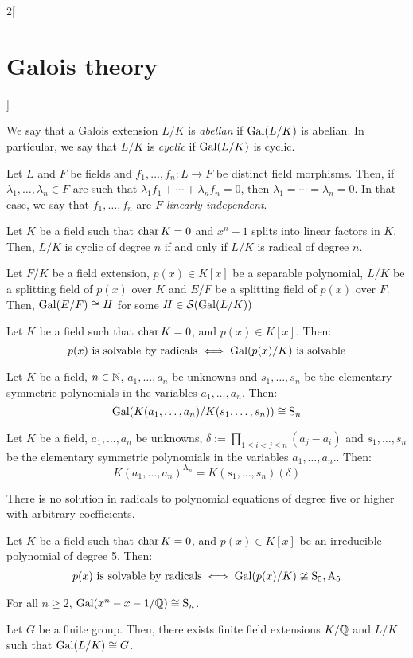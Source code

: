 \documentclass[../../../main.tex]{subfiles}
\begin{document}
\begin{multicols}{2}[\section{Galois theory}]
  \begin{definition}
    We say that a Galois extension $L/K$ is \emph{abelian} if $\operatorname{Gal}(L/K)$ is abelian. In particular, we say that $L/K$ is \emph{cyclic} if $\operatorname{Gal}(L/K)$ is cyclic.
  \end{definition}
  \begin{lemma}
    Let $L$ and $F$ be fields and $f_1,\ldots,f_n:L\rightarrow F$ be distinct field morphisms. Then, if $\lambda_1,\ldots,\lambda_n\in F$ are such that $\lambda_1f_1+\cdots+\lambda_nf_n=0$, then $\lambda_1=\cdots=\lambda_n=0$. In that case, we say that $f_1,\ldots,f_n$ are \emph{$F$-linearly independent}.
  \end{lemma}
  \begin{theorem}
    Let $K$ be a field such that $\operatorname{char} K=0$ and $x^n-1$ splits into linear factors in $K$. Then, $L/K$ is cyclic of degree $n$ if and only if $L/K$ is radical of degree $n$.
  \end{theorem}
  \begin{lemma}
    Let $F/K$ be a field extension, $p(x)\in K[x]$ be a separable polynomial, $L/K$ be a splitting field of $p(x)$ over $K$ and $E/F$ be a splitting field of $p(x)$ over $F$. Then, $\operatorname{Gal}(E/F)\cong H$ for some $H\in\mathcal{S}(\operatorname{Gal}(L/K))$
  \end{lemma}
  \begin{theorem}
    Let $K$ be a field such that $\operatorname{char} K=0$, and $p(x)\in K[x]$. Then: $$p(x)\text{ is solvable by radicals}\iff\operatorname{Gal}(p(x)/K)\text{ is solvable}$$
  \end{theorem}
  \begin{lemma}
    Let $K$ be a field, $n\in\mathbb{N}$, $a_1,\ldots,a_n$ be unknowns and $s_1,\ldots,s_n$ be the elementary symmetric polynomials in the variables $a_1,\ldots,a_n$. Then: $$\operatorname{Gal}(K(a_1,\ldots,a_n)/K(s_1,\ldots,s_n))\cong \text{S}_n$$
  \end{lemma}
  \begin{corollary}
    Let $K$ be a field, $a_1,\ldots,a_n$ be unknowns, $\delta:=\prod_{1\leq i<j\leq n}(a_j-a_i)$ and $s_1,\ldots,s_n$ be the elementary symmetric polynomials in the variables $a_1,\ldots,a_n$.. Then: $${K(a_1,\ldots,a_n)}^{\text{A}_n}=K(s_1,\ldots,s_n)(\delta)$$
  \end{corollary}
  \begin{theorem}
    There is no solution in radicals to polynomial equations of degree five or higher with arbitrary coefficients.
  \end{theorem}
  \begin{proposition}
    Let $K$ be a field such that $\operatorname{char} K=0$, and $p(x)\in K[x]$ be an irreducible polynomial of degree 5. Then:
    $$p(x)\text{ is solvable by radicals}\iff\operatorname{Gal}(p(x)/K)\ncong\text{S}_5,\text{A}_5$$
  \end{proposition}
  \begin{theorem}
    For all $n\geq 2$, $\operatorname{Gal}(x^n-x-1/\mathbb{Q})\cong \text{S}_n$.
  \end{theorem}
  \begin{corollary}
    Let $G$ be a finite group. Then, there exists finite field extensions $K/\mathbb{Q}$ and $L/K$ such that $\operatorname{Gal}(L/K)\cong G$.
  \end{corollary}

\end{multicols}
\end{document}
